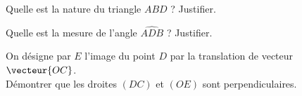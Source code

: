 \begin{myenumerate}
  \item Quelle est la nature du triangle $ABD$ ? Justifier.
  \item Quelle est la mesure de l'angle $\widehat{ADB}$ ? Justifier.
  \item On désigne par $E$ l'image du point $D$ par la translation de vecteur $\vecteur{OC}$.\\Démontrer que les droites $(DC)$ et $(OE)$ sont perpendiculaires.
\end{myenumerate}
